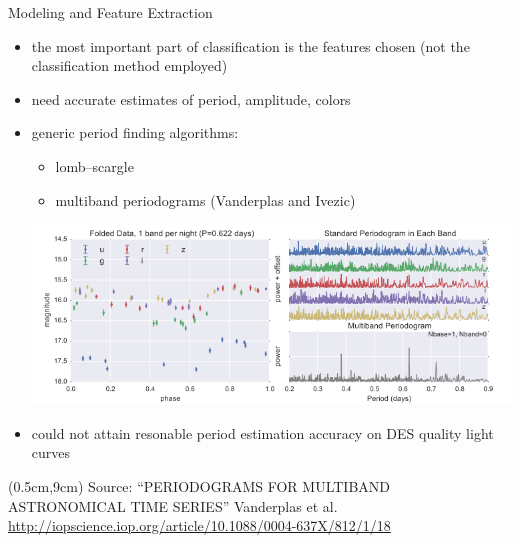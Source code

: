 \documentclass[12pt]{beamer}
\newcommand{\att}[1]{\begin{textblock*}{12cm}(0.5cm,9cm) %
  {\tiny Source: #1}
      \end{textblock*}}
\begin{document}
\begin{frame}{Modeling and Feature Extraction}

  \vspace{-.1in}
  
  \begin{itemize}
  \item the most important part of classification is the features chosen (not the classification method employed)
  \item need accurate estimates of period, amplitude, colors
  \item generic period finding algorithms:
    \begin{itemize}
    \item lomb--scargle
    \item multiband periodograms (Vanderplas and Ivezic)
    \end{itemize}
  \begin{center}
    \includegraphics[scale=0.35]{figs/vanderplas_periodogram.png}
  \end{center}
  \vspace{-.15in}
\item could not attain resonable period estimation accuracy on DES quality light curves
  \end{itemize}
  
  \att{``PERIODOGRAMS FOR MULTIBAND ASTRONOMICAL TIME SERIES'' Vanderplas et al. \url{http://iopscience.iop.org/article/10.1088/0004-637X/812/1/18}\\}
\end{frame}
\end{document}
